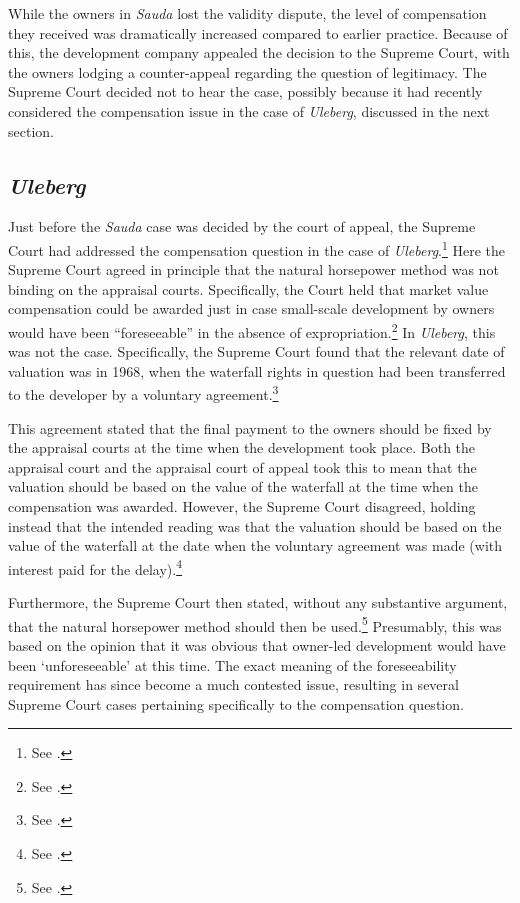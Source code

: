 While the owners in {\it Sauda} lost the validity dispute, the level of compensation they received was dramatically increased compared to earlier practice. Because of this, the development company appealed the decision to the Supreme Court, with the owners lodging a counter-appeal regarding the question of legitimacy. The Supreme Court decided not to hear the case, possibly because it had recently considered the compensation issue in the case of {\it Uleberg}, discussed in the next section.

\subsection{{\it Uleberg}}\label{sec:5:5:2}

Just before the {\it Sauda} case was decided by the court of appeal, the Supreme Court had addressed the compensation question in the case of {\it Uleberg}.\footnote{See \cite{uleberg08}.} Here the Supreme Court agreed in principle that the natural horsepower method was not binding on the appraisal courts. Specifically, the Court held that market value compensation could be awarded just in case small-scale development by owners would have been ``foreseeable'' in the absence of expropriation.\footnote{See \cite[81]{uleberg08}.} In {\it Uleberg}, this was not the case. Specifically, the Supreme Court found that the relevant date of valuation was in 1968, when the waterfall rights in question had been transferred to the developer by a voluntary agreement.\footnote{See \cite[70]{uleberg08}.}

This agreement stated that the final payment to the owners should be fixed by the appraisal courts at the time when the development took place. Both the appraisal court and the appraisal court of appeal took this to mean that the valuation should be based on the value of the waterfall at the time when the compensation was awarded. However, the Supreme Court disagreed, holding instead that the intended reading was that the valuation should be based on the value of the waterfall at the date when the voluntary agreement was made (with interest paid for the delay).\footnote{See \cite[71]{uleberg08}.}

Furthermore, the Supreme Court then stated, without any substantive argument, that the natural horsepower method should then be used.\footnote{See \cite[62]{uleberg08}.} Presumably, this was based on the opinion that it was obvious that owner-led development would have been `unforeseeable' at this time. The exact meaning of the foreseeability requirement has since become a much contested issue, resulting in several Supreme Court cases pertaining specifically to the compensation question.

